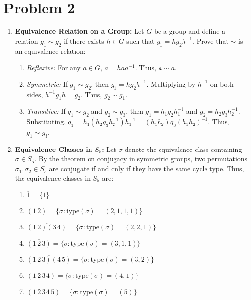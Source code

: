 \documentclass[12pt]{article}
\begin{document}
\section*{Problem 2}

\begin{enumerate}[label=\roman*., leftmargin=*, align=left]
    \item \textbf{Equivalence Relation on a Group:}  
    Let $G$ be a group and define a relation $g_1 \sim g_2$ if there exists $h \in G$ such that $g_1 = hg_2h^{-1}$. Prove that $\sim$ is an equivalence relation:
    \begin{enumerate}[label=\alph*., leftmargin=*]
        \item \textit{Reflexive:} For any $a \in G$, $a = haa^{-1}$. Thus, $a \sim a$.
        \item \textit{Symmetric:} If $g_1 \sim g_2$, then $g_1 = hg_2h^{-1}$. Multiplying by $h^{-1}$ on both sides, $h^{-1}g_1h = g_2$. Thus, $g_2 \sim g_1$.
        \item \textit{Transitive:} If $g_1 \sim g_2$ and $g_2 \sim g_3$, then $g_1 = h_1g_2h_1^{-1}$ and $g_2 = h_2g_3h_2^{-1}$. Substituting, $g_1 = h_1(h_2g_3h_2^{-1})h_1^{-1} = (h_1h_2)g_3(h_1h_2)^{-1}$. Thus, $g_1 \sim g_3$.
    \end{enumerate}

    \item \textbf{Equivalence Classes in $S_5$:}  
    Let $\overline{\sigma}$ denote the equivalence class containing $\sigma \in S_5$. By the theorem on conjugacy in symmetric groups, two permutations $\sigma_1, \sigma_2 \in S_5$ are conjugate if and only if they have the same cycle type. Thus, the equivalence classes in $S_5$ are:
    \begin{enumerate}[label=(\arabic*), leftmargin=*]
        \item $\overline{1} = \{1\}$
        \item $\overline{(1\,2)} = \{\sigma : \text{type}(\sigma) = (2, 1, 1, 1)\}$
        \item $\overline{(1\,2)(3\,4)} = \{\sigma : \text{type}(\sigma) = (2, 2, 1)\}$
        \item $\overline{(1\,2\,3)} = \{\sigma : \text{type}(\sigma) = (3, 1, 1)\}$
        \item $\overline{(1\,2\,3)(4\,5)} = \{\sigma : \text{type}(\sigma) = (3, 2)\}$
        \item $\overline{(1\,2\,3\,4)} = \{\sigma : \text{type}(\sigma) = (4, 1)\}$
        \item $\overline{(1\,2\,3\,4\,5)} = \{\sigma : \text{type}(\sigma) = (5)\}$
    \end{enumerate}
\end{enumerate}
\end{document}
